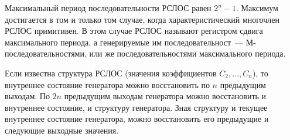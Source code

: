 \exampleend

Максимальный период последовательности РСЛОС равен $2^n - 1$. Максимум достигается в том и только том случае, когда характеристический многочлен РСЛОС примитивен. В этом случае РСЛОС называют регистром сдвига максимального периода, а генерируемые им последовательност~--- М-последовательностями, или же последовательностями максимального периода.

Если известна структура РСЛОС (значения коэффициентов $C_2, \dots, C_n$), то внутреннее состояние генератора можно восстановить по $n$ предыдущим выходам. По $2n$ предыдущим выходам генератора можно восстановить и внутреннее состояние, и структуру генератора. Зная структуру и текущее внутреннее состояние генератора, можно восстановить его предыдущие и следующие выходные значения.
